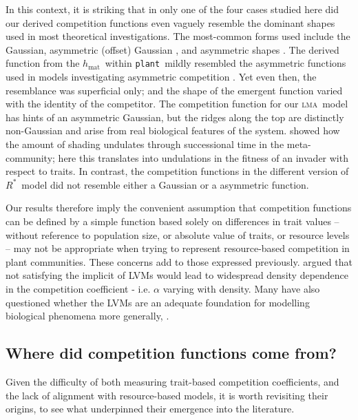 \documentclass[a4paper,11pt]{article}
\newcommand{\Rstar}{\ensuremath{R^*}}
\newcommand{\plant}{{\tt plant}}
\newcommand{\hmat}{\ensuremath{h_{\text{mat}}}}
\newcommand{\lma}{\textsc{lma}}
\begin{document}
In this context, it is striking that in only one of the four cases
studied here did our derived competition functions even vaguely
resemble the dominant shapes used in most theoretical
investigations. The most-common forms used include the Gaussian,
asymmetric (offset) Gaussian \citep{Roughgarden-1979}, and asymmetric
shapes \citep[e.g.][]{Kisdi-1999, Law-1997}. The derived function from
the \hmat\ within \plant\ mildly resembled the asymmetric functions
used in models investigating asymmetric competition \citep{Law-1997,
  Geritz-1999, Kisdi-1999, Calcagno-2006}. Yet even then, the
resemblance was superficial only; and the shape of the emergent
function varied with the identity of the competitor. The competition
function for our \lma\ model has hints of an asymmetric Gaussian, but
the ridges along the top are distinctly non-Gaussian and arise from
real biological features of the system. \citet{Falster-2011} showed
how the amount of shading undulates through successional time in the meta-community; here this translates into undulations in the fitness of an invader with respect to traits. In contrast, the competition functions in the different version of \Rstar\ model did not resemble either a Gaussian or a asymmetric function.

Our results therefore imply the convenient assumption that competition functions can be defined by a simple function based solely on differences in trait values -- without reference to population size, or absolute value of traits, or resource levels -- may not be appropriate when trying to represent resource-based competition in plant communities. These concerns add to those expressed previously. \citet{Abrams-1980} argued that not satisfying the implicit of LVMs would lead to widespread density dependence in the competition coefficient - i.e. $\alpha$ varying with density. Many have also questioned whether the LVMs are an adequate foundation for modelling biological phenomena more generally, \citep[e.g.][]{Andrewartha-1953, Neill-1974, Abrams-1975, Wangersky-1978,Abrams-1980, Tilman-1987, Abrams-2008}.

\subsection{Where did competition functions come from?}

Given the difficulty of both measuring trait-based competition coefficients, and the lack of alignment with resource-based models, it is worth revisiting their origins, to see what underpinned their emergence into the literature.
\end{document}

